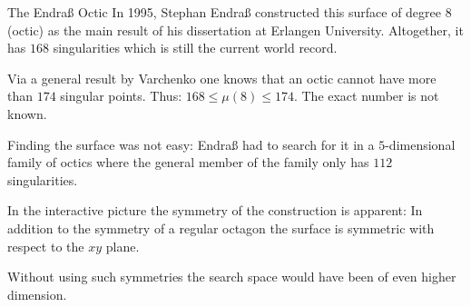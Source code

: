 \begin{surferPage}{The Endraß Octic}
     In 1995, Stephan Endraß constructed this surface of degree $8$ (octic) as the 
    main result of his dissertation at Erlangen University.
    Altogether, it has $168$ singularities which is still the current world
    record. 
  
     Via a general result by Varchenko one knows that an octic cannot have more
    than $174$ singular points.
    Thus: $168 \le \mu(8) \le 174$. 
    The exact number is not known.

     Finding the surface was not easy: Endraß had to search for it in a
    $5$-dimensional family of octics where the general member of the family
    only has $112$ singularities.

    In the interactive picture the symmetry of the construction is apparent: 
    In addition to the symmetry of a regular octagon the surface is symmetric
    with respect to the $xy$ plane.

    Without using such symmetries the search space would have been of even
    higher dimension.
\end{surferPage}
